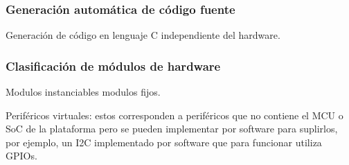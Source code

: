 
\subsubsection{Generación automática de código fuente}
\label{sec:codeGeneration}

Generación de código en lenguaje C independiente del hardware.



\subsubsection{Clasificación de módulos de hardware}

Modulos instanciables modulos fijos.

Periféricos virtuales: estos corresponden a periféricos que no contiene el MCU o SoC de la plataforma pero se pueden implementar por software para suplirlos, por ejemplo, un I2C implementado por software que para funcionar utiliza GPIOs.

